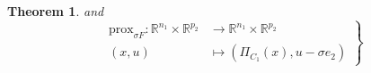 \documentclass{article} %
\newtheorem{theorem}{Theorem} \newtheorem{lemma}[theorem]{Lemma}
\begin{document}
\begin{theorem}
  and
  \begin{equation}
    \left .
    \begin{split}
      \text{prox}_{\sigma F}: \mathbb{R}^{n_1} \times \mathbb{R}^{p_2} &\rightarrow \mathbb{R}^{n_1} \times \mathbb{R}^{p_2}\\
      (x, u) &\mapsto (\Pi_{C_1}(x), u - \sigma e_2)
    \end{split}
    \right\}
  \end{equation}
  \label{thm:pd}
\end{theorem}

\end{document}
